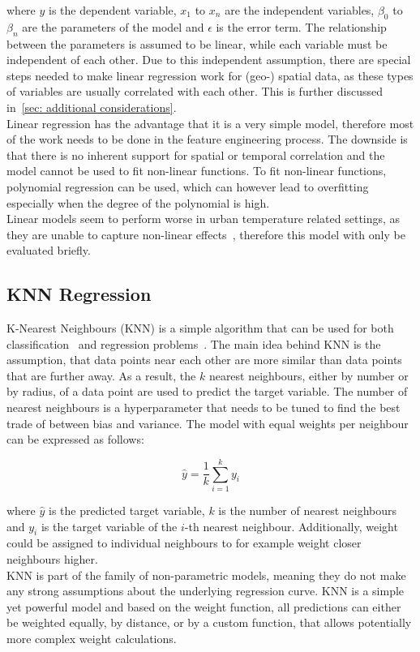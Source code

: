 where $y$ is the dependent variable, $x_1$ to $x_n$ are the independent variables, $\beta_0$ to $\beta_n$ are the parameters of the model and $\epsilon$ is the error term. The relationship between the parameters is assumed to be linear, while each variable must be independent of each other. Due to this independent assumption, there are special steps needed to make linear regression work for (geo-) spatial data, as these types of variables are usually correlated with each other. This is further discussed in~\ref{sec: additional considerations}.\\
Linear regression has the advantage that it is a very simple model, therefore most of the work needs to be done in the feature engineering process. The downside is that there is no inherent support for spatial or temporal correlation and the model cannot be used to fit non-linear functions. To fit non-linear functions, polynomial regression can be used, which can however lead to overfitting especially when the degree of the polynomial is high.\\
Linear models seem to perform worse in urban temperature related settings, as they are unable to capture non-linear effects~\cite{voelkel2017towards}, therefore this model with only be evaluated briefly.

\subsection{KNN Regression}

K-Nearest Neighbours (KNN) is a simple algorithm that can be used for both classification~\cite{cover1967nearest} and regression problems~\cite{altman1992introduction}. The main idea behind KNN is the assumption, that data points near each other are more similar than data points that are further away. As a result, the $k$ nearest neighbours, either by number or by radius, of a data point are used to predict the target variable. The number of nearest neighbours is a hyperparameter that needs to be tuned to find the best trade of between bias and variance. The model with equal weights per neighbour can be expressed as follows:

\begin{equation}
    \hat{y} = \frac{1}{k} \sum_{i=1}^{k} y_i
\end{equation}

where $\hat{y}$ is the predicted target variable, $k$ is the number of nearest neighbours and $y_i$ is the target variable of the $i$-th nearest neighbour. Additionally, weight could be assigned to individual neighbours to for example weight closer neighbours higher.\\
KNN is part of the family of non-parametric models, meaning they do not make any strong assumptions about the underlying regression curve. KNN is a simple yet powerful model and based on the weight function, all predictions can either be weighted equally, by distance, or by a custom function, that allows potentially more complex weight calculations.

